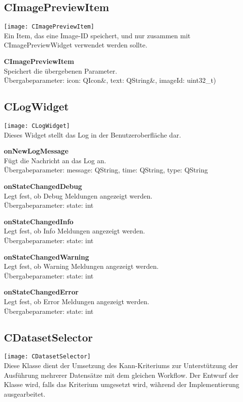 \subsection{CImagePreviewItem}
\texttt{[image: CImagePreviewItem]}\\
Ein Item, das eine Image-ID speichert, und nur zusammen mit CImagePreviewWidget verwendet werden sollte.
\beginMembers
\item \textbf{CImagePreviewItem} \\Speichert die übergebenen Parameter. \\Übergabeparameter:  icon: QIcon\&, text: QString\&, imageId: uint32\_t)
\closeMembers

\subsection{CLogWidget}
\texttt{[image: CLogWidget]}\\
Dieses Widget stellt das Log in der Benutzeroberfläche dar.
\beginSlots
\item \textbf{onNewLogMessage} \\Fügt die Nachricht an das Log an. \\Übergabeparameter: message: QString, time: QString, type: QString
\item \textbf{onStateChangedDebug} \\Legt fest, ob Debug Meldungen angezeigt werden. \\Übergabeparameter: state: int
\item \textbf{onStateChangedInfo} \\Legt fest, ob Info Meldungen angezeigt werden. \\Übergabeparameter: state: int
\item \textbf{onStateChangedWarning} \\Legt fest, ob Warning Meldungen angezeigt werden. \\Übergabeparameter: state: int
\item \textbf{onStateChangedError} \\Legt fest, ob Error Meldungen angezeigt werden. \\Übergabeparameter: state: int
\closeMembers

\subsection{CDatasetSelector}
\texttt{[image: CDatasetSelector]}\\
Diese Klasse dient der Umsetzung des Kann-Kriteriums zur Unterstützung der Ausführung mehrerer Datensätze mit dem gleichen Workflow. Der Entwurf der Klasse wird, falls das Kriterium umgesetzt wird, während der Implementierung ausgearbeitet.

